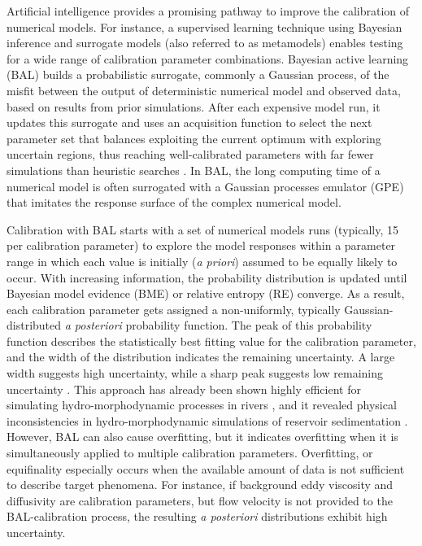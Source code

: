 \documentclass[draft,linenumbers,onecolumn]{agujournal2019} %
\begin{document}
Artificial intelligence provides a promising pathway to improve the calibration of numerical models. For instance, a supervised learning technique using Bayesian inference and surrogate models (also referred to as metamodels) enables testing for a wide range of calibration parameter combinations. Bayesian active learning (BAL) builds a probabilistic surrogate, commonly a Gaussian process, of the misfit between the output of deterministic numerical model and observed data, based on results from prior simulations. After each expensive model run, it updates this surrogate and uses an acquisition function to select the next parameter set that balances exploiting the current optimum with exploring uncertain regions, thus reaching well-calibrated parameters with far fewer simulations than heuristic searches \cite{oladyshkin2020bayesian3,rasmussen2006gaussian}. In BAL, the long computing time of a numerical model is often surrogated with a Gaussian processes emulator (GPE) that imitates the response surface of the complex numerical model. 

Calibration with BAL starts with a set of numerical models runs (typically, 15 per calibration parameter) to explore the model responses within a parameter range in which each value is initially (\textit{a priori})  assumed to be equally likely to occur. With increasing information, the probability distribution is updated until Bayesian model evidence (BME) or relative entropy (RE) converge. As a result, each calibration parameter gets assigned a non-uniformly, typically Gaussian-distributed \textit{a posteriori} probability function. The peak of this probability function describes the statistically best fitting value for the calibration parameter, and the width of the distribution indicates the remaining uncertainty. A large width suggests high uncertainty, while a sharp peak suggests low remaining uncertainty \cite{oladyshkin2020bayesian3}. This approach has already been shown highly efficient for simulating hydro-morphodynamic processes in rivers \cite{beckers2020bayesian}, and it revealed physical inconsistencies in hydro-morphodynamic simulations of reservoir sedimentation \cite{mouris2023stability}. However, BAL can also cause overfitting, but it indicates overfitting when it is simultaneously applied to multiple calibration parameters. Overfitting, or equifinality especially occurs when the available amount of data is not sufficient to describe target phenomena. For instance, if background eddy viscosity and diffusivity are calibration parameters, but flow velocity is not provided to the BAL-calibration process, the resulting \textit{a posteriori} distributions exhibit high uncertainty.
\end{document}
